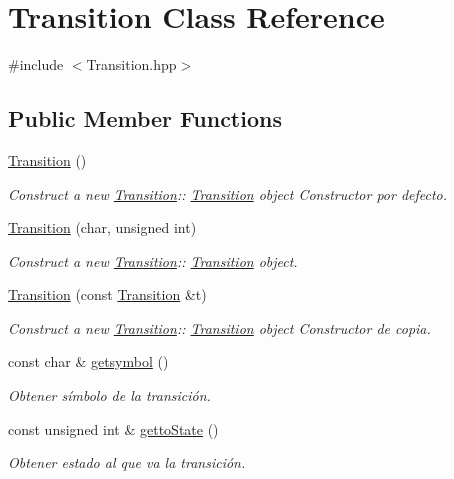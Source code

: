 \hypertarget{class_transition}{}\section{Transition Class Reference}
\label{class_transition}


{\ttfamily \#include $<$Transition.\+hpp$>$}

\subsection*{Public Member Functions}
\begin{DoxyCompactItemize}
\item 
\hyperlink{class_transition_a73b44b2338b11807f77b620a3e810f92}{Transition} ()
\begin{DoxyCompactList}\small\item\em Construct a new \hyperlink{class_transition}{Transition}\+:\+: \hyperlink{class_transition}{Transition} object Constructor por defecto. \end{DoxyCompactList}\item 
\hyperlink{class_transition_ab49cf908eba3466ddcd65b144d3c2fc4}{Transition} (char, unsigned int)
\begin{DoxyCompactList}\small\item\em Construct a new \hyperlink{class_transition}{Transition}\+:\+: \hyperlink{class_transition}{Transition} object. \end{DoxyCompactList}\item 
\hyperlink{class_transition_a3a95a02ec9471b3af89c3f1b947048fc}{Transition} (const \hyperlink{class_transition}{Transition} \&t)
\begin{DoxyCompactList}\small\item\em Construct a new \hyperlink{class_transition}{Transition}\+:\+: \hyperlink{class_transition}{Transition} object Constructor de copia. \end{DoxyCompactList}\item 
const char \& \hyperlink{class_transition_a369a807fa22249a5eea8ace9d8fc10ce}{getsymbol} ()
\begin{DoxyCompactList}\small\item\em Obtener símbolo de la transición. \end{DoxyCompactList}\item 
const unsigned int \& \hyperlink{class_transition_a39709e1a9cb0b79dea569a4e1a7440c0}{getto\+State} ()
\begin{DoxyCompactList}\small\item\em Obtener estado al que va la transición. \end{DoxyCompactList}\item 

\end{DoxyCompactItemize}
